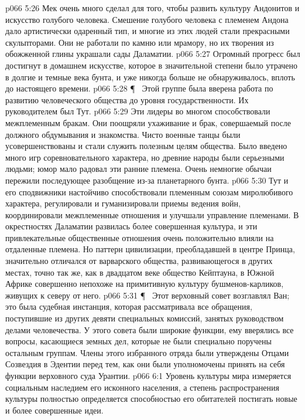 \vs p066 5:26 Мек очень много сделал для того, чтобы развить культуру Андонитов и искусство голубого человека. Смешение голубого человека с племенем Андона дало артистически одаренный тип, и многие из этих людей стали прекрасными скульпторами. Они не работали по камню или мрамору, но их творения из обожженной глины украшали сады Даламатии.
\vs p066 5:27 Огромный прогресс был достигнут в домашнем искусстве, которое в значительной степени было утрачено в долгие и темные века бунта, и уже никогда больше не обнаруживалось, вплоть до настоящего времени.
\vs p066 5:28 \P\ \bibnobreakspace {} Этой группе была вверена работа по развитию человеческого общества до уровня государственности. Их руководителем был Тут.
\vs p066 5:29 Эти лидеры во многом способствовали межплеменным бракам. Они поощряли ухаживание и брак, совершаемый после должного обдумывания и знакомства. Чисто военные танцы были усовершенствованы и стали служить полезным целям общества. Было введено много игр соревновательного характера, но древние народы были серьезными людьми; юмор мало радовал эти ранние племена. Очень немногие обычаи пережили последующее разобщение из\hyp{}за планетарного бунта.
\vs p066 5:30 Тут и его сподвижники настойчиво способствовали племенным союзам миролюбивого характера, регулировали и гуманизировали приемы ведения войн, координировали межплеменные отношения и улучшали управление племенами. В окрестностях Даламатии развилась более совершенная культура, и эти привлекательные общественные отношения очень положительно влияли на отдаленные племена. Но паттерн цивилизации, преобладавшей в центре Принца, значительно отличался от варварского общества, развивающегося в других местах, точно так же, как в двадцатом веке общество Кейптауна, в Южной Африке совершенно непохоже на примитивную культуру бушменов\hyp{}карликов, живущих к северу от него.
\vs p066 5:31 \P\ \bibnobreakspace {} Этот верховный совет возглавлял Ван; это была судебная инстанция, которая рассматривала все обращения, поступившие из других девяти специальных комиссий, занятых руководством делами человечества. У этого совета были широкие функции, ему вверялись все вопросы, касающиеся земных дел, которые не были специально поручены остальным группам. Члены этого избранного отряда были утверждены Отцами Созвездия в Эдентии перед тем, как они были уполномочены принять на себя функции верховного суда Урантии.
\vs p066 6:1 Уровень культуры мира измеряется социальным наследием его исконного населения, а степень распространения культуры полностью определяется способностью его обитателей постигать новые и более совершенные идеи.
